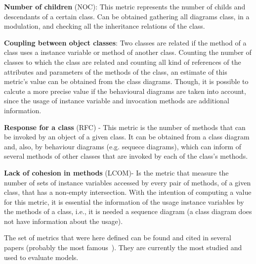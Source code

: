 \textbf{Number of children} (NOC): This metric represents the number of childs and descendants of a certain class. Can be obtained gathering all diagrams class, in a \umlS modulation, and checking all the inheritance relations of the class.

\textbf{Coupling between object classes}: Two classes are related if the method of a class uses a instance variable or method of another class. Counting the number of classes to which the class are related and counting all kind of references of the attributes and parameters of the methods of the class, an estimate of this metric's value can be obtained from the class diagrams. Though, it is possible to calcute a more precise value if the behavioural diagrams are taken into account, since the usage of instance variable and invocation methods are additional information.

\textbf{Response for a class} (RFC) - This metric is the number of methods that can be invoked by an object of a given class. It can be obtained from a class diagram and, also, by behaviour diagrams (e.g. sequece diagrams), which can inform of several methods of other classes that are invoked by each of the class's methods.

\textbf{Lack of cohesion in methods} (LCOM)- Is the metric that measure the number of sets of instance variables accessed by every pair of methods, of a given class, that has a non-empty intersection. With the intention of computing a value for this metric, it is essential the information of the usage instance variables by the methods of a class, i.e., it is needed a sequence diagram (a class diagram does not have information about the usage).

The set of metrics that were here defined can be found and cited in several papers (probably the most famous~\cite{Power2}). They are currently the most studied and used to evaluate \uml models.\\



